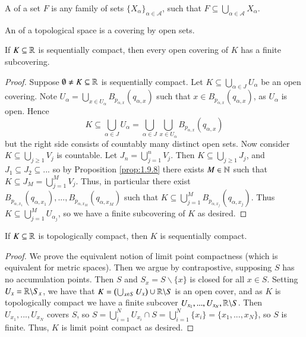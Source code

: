 \begin{defn}
    A  of a set $F$ is any family of sets $\{X_{\alpha}\}_{\alpha \in \mathcal{A}}$, such that $F \subseteq \bigcup_{\alpha \in \mathcal{A}} X_{\alpha}$.
\end{defn}

\begin{defn}
    An  of a topological space is a covering by open sets.
\end{defn}

\begin{prop}\label{prop:1.9.11}
    If $K \subseteq \mathbb R$ is sequentially compact, then every open covering of $K$ has a finite subcovering.
\end{prop}
\begin{proof}
    Suppose $\emptyset\neq K \subseteq \mathbb R$ is sequentially compact. Let $K \subseteq \bigcup_{\alpha \in J}U_{\alpha}$ be an open covering. Note $U_{\alpha} = \bigcup_{x \in U_{\alpha}}B_{p_{\alpha,x}}(q_{\alpha,x})$ such that $x \in B_{p_{\alpha,x}}(q_{\alpha,x})$, as $U_{\alpha}$ is open. Hence $$K \subseteq \bigcup_{\alpha \in J}U_{\alpha} = \bigcup_{\alpha \in J}\bigcup_{x \in U_{\alpha}}B_{p_{\alpha,x}}(q_{\alpha,x})$$ but the right side consists of countably many distinct open sets. Now consider $K \subseteq \bigcup_{j\geq 1}V_j$ is countable. Let $J_n = \bigcup_{j=1}^nV_j$. Then $K \subseteq \bigcup_{j\geq 1}J_j$, and $J_1 \subseteq J_2 \subseteq ...$ so by Proposition \ref{prop:1.9.8} there exists $M \in \mathbb N$ such that $K \subseteq J_M = \bigcup_{j=1}^MV_j$. Thus, in particular there exist $B_{p_{\alpha,x_1}}(q_{\alpha,x_1}),...,B_{p_{\alpha,x_M}}(q_{\alpha,x_M})$ such that $K \subseteq \bigcup_{j=1}^MB_{p_{\alpha,x_j}}(q_{\alpha,x_j})$. Thus $K \subseteq \bigcup_{j=1}^MU_{\alpha_j}$, so we have a finite subcovering of $K$ as desired.
\end{proof}

\begin{prop}
    If $K \subseteq \mathbb R$ is topologically compact, then $K$ is sequentially compact.
\end{prop}
\begin{proof}
    We prove the equivalent notion of limit point compactness (which is equivalent for metric spaces). Then we argue by contrapostive, supposing $S$ has no accumulation points. Then $S$ and $S_x = S\backslash\{x\}$ is closed for all $x \in S$. Setting $U_x = \mathbb R\backslash S_x$, we have that $K = \left(\bigcup_{x \in S}U_x\right)\cup \mathbb R\backslash S$ is an open cover, and as $K$ is topologically compact we have a finite subcover $U_{x_1},...,U_{x_N},\mathbb R\backslash S$. Then $U_{x_1},...,U_{x_N}$ covers $S$, so $S = \bigcup_{i=1}^NU_{x_i}\cap S = \bigcup_{i=1}^N\{x_i\} = \{x_1,...,x_N\}$, so $S$ is finite. Thus, $K$ is limit point compact as desired.
\end{proof}

